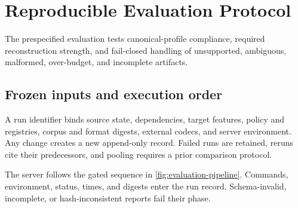 \section{Reproducible Evaluation Protocol}
\label{sec:evaluation}

The prespecified evaluation tests canonical-profile compliance, required
reconstruction strength, and fail-closed handling of unsupported, ambiguous,
malformed, over-budget, and incomplete artifacts.

\subsection{Frozen inputs and execution order}
\label{subsec:frozen-run}

A run identifier binds source state, dependencies, target features, policy and
registries, corpus and format digests, external codecs, and server environment.
Any change creates a new append-only record. Failed runs are retained, reruns
cite their predecessors, and pooling requires a prior comparison protocol.

The server follows the gated sequence in
\cref{fig:evaluation-pipeline}. Commands, environment, status, times, and
digests enter the run record. Schema-invalid, incomplete, or hash-inconsistent
reports fail their phase.

